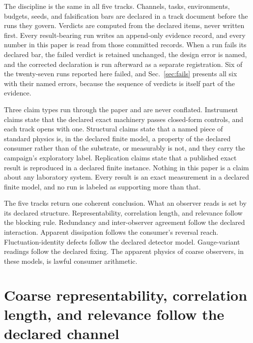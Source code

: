 \documentclass[aps,pre,reprint,nofootinbib,floatfix]{revtex4-2}
\begin{document}
The discipline is the same in all five tracks.  Channels, tasks,
environments, budgets, seeds, and falsification bars are declared
in a track document before the runs they govern.  Verdicts are
computed from the declared items, never written first.  Every
result-bearing run writes an append-only evidence record, and
every number in this paper is read from those committed records.
When a run fails its declared bar, the failed verdict is retained
unchanged, the design error is named, and the corrected
declaration is run afterward as a separate registration.  Six of
the twenty-seven runs reported here failed, and
Sec.~\ref{sec:fails} presents all six with their named errors,
because the sequence of verdicts is itself part of the evidence.

Three claim types run through the paper and are never conflated.
Instrument claims state that the declared exact machinery passes
closed-form controls, and each track opens with one.  Structural
claims state that a named piece of standard physics is, in the
declared finite model, a property of the declared consumer rather
than of the substrate, or measurably is not, and they carry the
campaign's exploratory label.  Replication claims state that a
published exact result is reproduced in a declared finite
instance.  Nothing in this paper is a claim about any laboratory
system.  Every result is an exact measurement in a declared finite
model, and no run is labeled as supporting more than that.

The five tracks return one coherent conclusion.  What an observer
reads is set by its declared structure.  Representability,
correlation length, and relevance follow the blocking rule.
Redundancy and inter-observer agreement follow the declared
interaction.  Apparent dissipation follows the consumer's reversal
reach.  Fluctuation-identity defects follow the declared detector
model.  Gauge-variant readings follow the declared fixing.  The
apparent physics of coarse observers, in these models, is lawful
consumer arithmetic.

\section{Coarse representability, correlation length, and
relevance follow the declared channel}
\label{sec:rg}
\end{document}
